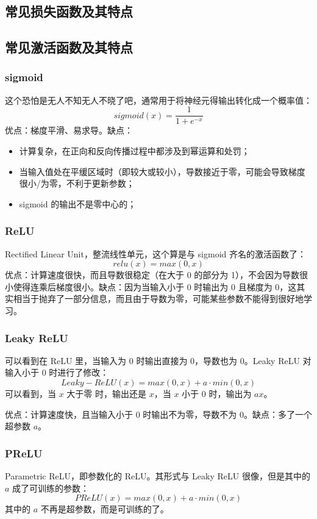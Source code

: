\subsection{常见损失函数及其特点}


\subsection{常见激活函数及其特点}
\subsubsection{sigmoid}
这个恐怕是无人不知无人不晓了吧，通常用于将神经元得输出转化成一个概率值：
$$
sigmoid(x) = \frac{1}{1 + e^{-x}}
$$
优点：梯度平滑、易求导。缺点：
\begin{itemize}
	\item 计算复杂，在正向和反向传播过程中都涉及到幂运算和处罚；
	
	\item 当输入值处在平缓区域时（即较大或较小），导数接近于零，可能会导致梯度很小/为零，不利于更新参数；
	
	\item sigmoid 的输出不是零中心的；
\end{itemize}


\subsubsection{ReLU}
Rectified Linear Unit，整流线性单元，这个算是与 sigmoid 齐名的激活函数了：
$$
relu(x) = max(0, x)
$$
优点：计算速度很快，而且导数很稳定（在大于 0 的部分为 1），不会因为导数很小使得连乘后梯度很小。缺点：因为当输入小于 0 时输出为 0 且梯度为 0，这其实相当于抛弃了一部分信息，而且由于导数为零，可能某些参数不能得到很好地学习。


\subsubsection{Leaky ReLU}
可以看到在 ReLU 里，当输入为 0 时输出直接为 0，导数也为 0。Leaky ReLU 对输入小于 0 时进行了修改：
$$
Leaky-ReLU(x) = max(0, x) + a \cdot min(0, x)
$$
可以看到，当 $x$ 大于零 时，输出还是 $x$，当 $x$ 小于 0 时，输出为 $a x$。

优点：计算速度快，且当输入小于 0 时输出不为零，导数不为 0。缺点：多了一个超参数 $a$。

\subsubsection{PReLU}
Parametric ReLU，即参数化的 ReLU。其形式与 Leaky ReLU 很像，但是其中的 $a$ 成了可训练的参数：
$$
PReLU(x) = max(0, x) + a \cdot min(0, x)
$$
其中的 $a$ 不再是超参数，而是可训练的了。

